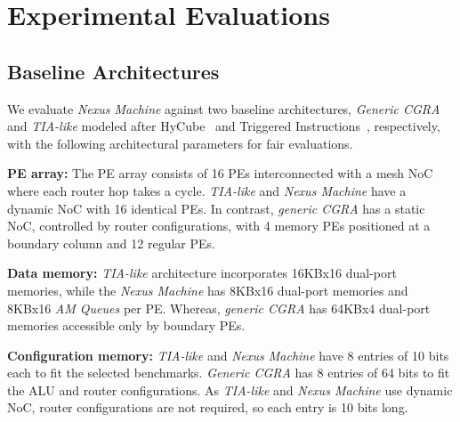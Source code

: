 \section{Experimental Evaluations}

\subsection{Baseline Architectures}
We evaluate \textit{Nexus Machine} against two baseline architectures, \textit{Generic CGRA} and \textit{TIA-like} modeled after HyCube~\cite{hycube} and Triggered Instructions~\cite{tia}, respectively, with the following architectural parameters for fair evaluations.

\textbf{PE array:} The PE array consists of 16 PEs interconnected with a mesh NoC where each router hop takes a cycle.
\textit{TIA-like} and \textit{Nexus Machine} have a dynamic NoC with 16 identical PEs.
In contrast, \textit{generic CGRA} has a static NoC, controlled by router configurations, with 4 memory PEs positioned at a boundary column and 12 regular PEs. 
\begin{comment}
{\color{blue} \textbf{Data memory:} \textit{TIA-like} and \textit{Nexus Machine} have 16KBx16 dual port memories, locally connected to each PE.
Whereas, \textit{generic CGRA} has 64KBx4 single-port memories accessible by the boundary PEs.}
\end{comment}

\textbf{Data memory:}  \textit{TIA-like} architecture incorporates 16KBx16 dual-port memories, while the \textit{Nexus Machine} has 8KBx16 dual-port memories and 8KBx16 \textit{AM Queues} per PE. Whereas, \textit{generic CGRA} has 64KBx4 dual-port memories accessible only by boundary PEs.

\textbf{Configuration memory:} \textit{TIA-like} and \textit{Nexus Machine} have 8 entries of 10 bits each to fit the selected benchmarks.
\textit{Generic CGRA} has 8 entries of 64 bits to fit the ALU and router configurations. As \textit{TIA-like} and \textit{Nexus Machine} use dynamic NoC, router configurations are not required, so each entry is 10 bits long.

